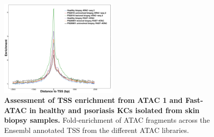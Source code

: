 \begin{figure}[htbp]
\centering
\includegraphics[width=0.5\textwidth]{./Appendix/pdfs/Chapter3/ATAC_skin_biopsy_samples_all_methods_TSS_enrichment_supplementary}
\caption[Assessment of TSS enrichment from ATAC 1 and Fast-ATAC in healthy and psoriasis KCs isolated from skin biopsy samples.]{\textbf{Assessment of TSS enrichment from ATAC 1 and Fast-ATAC in healthy and psoriasis KCs isolated from skin biopsy samples.} Fold-enrichment of ATAC fragments across the Ensembl annotated TSS from the different ATAC libraries.}
\label{figure:TSS_skin_biopsies}
\end{figure}



